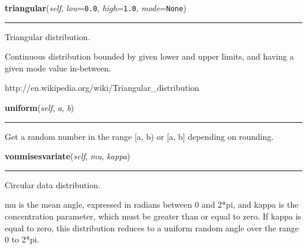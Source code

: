 \hspace{.8\funcindent}\begin{boxedminipage}{\funcwidth}

    \raggedright \textbf{triangular}(\textit{self}, \textit{low}={\tt 0.0}, \textit{high}={\tt 1.0}, \textit{mode}={\tt None})

    \vspace{-1.5ex}

    \rule{\textwidth}{0.5\fboxrule}
\setlength{\parskip}{2ex}
    Triangular distribution.

    Continuous distribution bounded by given lower and upper limits, and 
    having a given mode value in-between.

    http://en.wikipedia.org/wiki/Triangular\_distribution

\setlength{\parskip}{1ex}
    \end{boxedminipage}

    \label{random:Random:uniform}

    \vspace{0.5ex}

\hspace{.8\funcindent}\begin{boxedminipage}{\funcwidth}

    \raggedright \textbf{uniform}(\textit{self}, \textit{a}, \textit{b})

    \vspace{-1.5ex}

    \rule{\textwidth}{0.5\fboxrule}
\setlength{\parskip}{2ex}
    Get a random number in the range [a, b) or [a, b] depending on 
    rounding.

\setlength{\parskip}{1ex}
    \end{boxedminipage}

    \label{random:Random:vonmisesvariate}

    \vspace{0.5ex}

\hspace{.8\funcindent}\begin{boxedminipage}{\funcwidth}

    \raggedright \textbf{vonmisesvariate}(\textit{self}, \textit{mu}, \textit{kappa})

    \vspace{-1.5ex}

    \rule{\textwidth}{0.5\fboxrule}
\setlength{\parskip}{2ex}
    Circular data distribution.

    mu is the mean angle, expressed in radians between 0 and 2*pi, and 
    kappa is the concentration parameter, which must be greater than or 
    equal to zero.  If kappa is equal to zero, this distribution reduces to
    a uniform random angle over the range 0 to 2*pi.

\setlength{\parskip}{1ex}
    \end{boxedminipage}

